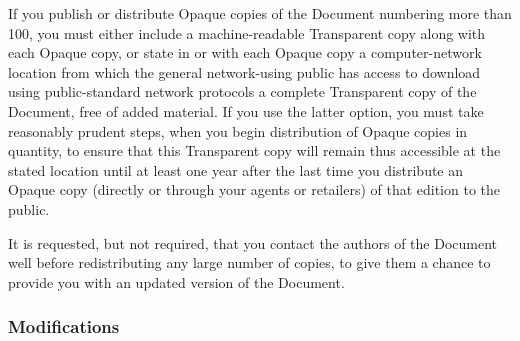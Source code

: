 If you publish or distribute Opaque copies of the Document numbering more than
100, you must either include a machine-readable Transparent copy along with
each Opaque copy, or state in or with each Opaque copy a computer-network
location from which the general network-using public has access to download
using public-standard network protocols a complete Transparent copy of the
Document, free of added material. If you use the latter option, you must take
reasonably prudent steps, when you begin distribution of Opaque copies in
quantity, to ensure that this Transparent copy will remain thus accessible at
the stated location until at least one year after the last time you distribute
an Opaque copy (directly or through your agents or retailers) of that edition
to the public.

It is requested, but not required, that you contact the authors of the Document
well before redistributing any large number of copies, to give them a chance to
provide you with an updated version of the Document.


\subsubsection{Modifications}

